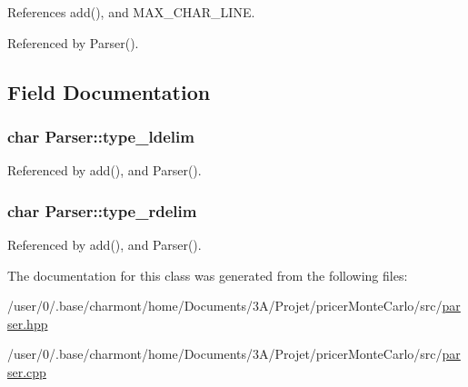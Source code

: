 References add(), and M\-A\-X\-\_\-\-C\-H\-A\-R\-\_\-\-L\-I\-N\-E.



Referenced by Parser().



\subsection{Field Documentation}
\hypertarget{classParser_a2b2cf77a6f8a340790e467557cbc5a12}{
\subsubsection[{type\-\_\-ldelim}]{\setlength{\rightskip}{0pt plus 5cm}char Parser\-::type\-\_\-ldelim\hspace{0.3cm}{\ttfamily [private]}}}\label{classParser_a2b2cf77a6f8a340790e467557cbc5a12}


Referenced by add(), and Parser().

\hypertarget{classParser_adfd95f7f5fce9f3d6effd2160ab3b4d3}{
\subsubsection[{type\-\_\-rdelim}]{\setlength{\rightskip}{0pt plus 5cm}char Parser\-::type\-\_\-rdelim\hspace{0.3cm}{\ttfamily [private]}}}\label{classParser_adfd95f7f5fce9f3d6effd2160ab3b4d3}


Referenced by add(), and Parser().



The documentation for this class was generated from the following files\-:\begin{DoxyCompactItemize}
\item 
/user/0/.\-base/charmont/home/\-Documents/3\-A/\-Projet/pricer\-Monte\-Carlo/src/\hyperlink{parser_8hpp}{parser.\-hpp}\item 
/user/0/.\-base/charmont/home/\-Documents/3\-A/\-Projet/pricer\-Monte\-Carlo/src/\hyperlink{parser_8cpp}{parser.\-cpp}\end{DoxyCompactItemize}
